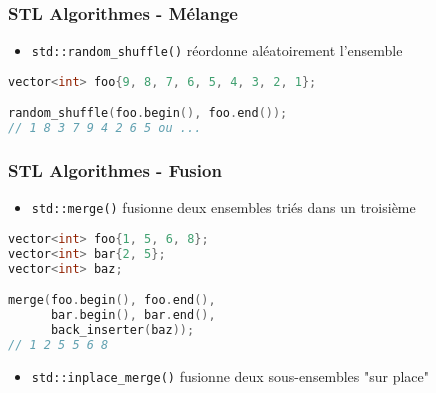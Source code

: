 \documentclass[C++.tex]{subfiles}
\begin{document}
\begin{frame}[fragile]
	\frametitle{STL Algorithmes - Mélange}
	\begin{itemize}
		\item \lstinline|std::random_shuffle()| réordonne aléatoirement l'ensemble
	\end{itemize}

	\begin{lstlisting}[language=C++]
vector<int> foo{9, 8, 7, 6, 5, 4, 3, 2, 1};

random_shuffle(foo.begin(), foo.end());
// 1 8 3 7 9 4 2 6 5 ou ...\end{lstlisting}
\end{frame}

\begin{frame}[fragile]
	\frametitle{STL Algorithmes - Fusion}
	\begin{itemize}
		\item \lstinline|std::merge()| fusionne deux ensembles triés dans un troisième
	\end{itemize}


	\begin{lstlisting}[language=C++]
vector<int> foo{1, 5, 6, 8};
vector<int> bar{2, 5};
vector<int> baz;

merge(foo.begin(), foo.end(), 
      bar.begin(), bar.end(), 
      back_inserter(baz));
// 1 2 5 5 6 8\end{lstlisting}

	\begin{itemize}
		\item \lstinline|std::inplace_merge()| fusionne deux sous-ensembles "sur place"
	\end{itemize}

\end{frame}
\end{document}
